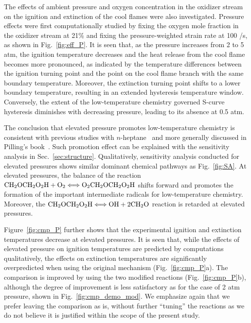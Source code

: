 \documentclass[review,3p,times]{elsarticle}
\begin{document}
The effects of ambient pressure and oxygen concentration in the oxidizer stream on the ignition and extinction of the cool flames were also investigated.  Pressure effects were first computationally studied by fixing the oxygen mole fraction in the oxidizer stream at 21\% and fixing the pressure-weighted strain rate at 100 /s, as shown in Fig.~\ref{fig:eff_P}.  It is seen that, as the pressure increases from 2 to 5 atm, the ignition temperature decreases and the heat release from the cool flame becomes more pronounced, as indicated by the temperature differences between the ignition turning point and the point on the cool flame branch with the same boundary temperature.  Moreover, the extinction turning point shifts to a lower boundary temperature, resulting in an extended hysteresis temperature window.  Conversely, the extent of the low-temperature chemistry governed S-curve hysteresis diminishes with decreasing pressure, leading to its absence at 0.5 atm.

\textcolor{Rev1}{The conclusion that elevated pressure promotes low-temperature chemistry is consistent with previous studies with $n$-heptane~\cite{ciezki93,law12} and more generally discussed in Pilling's book~\cite{pillingbook}}.  Such promotion effect can be explained with the sensitivity analysis in Sec.~\ref{sec:structure}.  Qualitatively, sensitivity analysis conducted for elevated pressures shows similar dominant chemical pathways as Fig.~\ref{fig:SA}.  At elevated pressures, the balance of the reaction $\rm{CH}_2\rm{OCH}_2\rm{O}_2\rm{H} + \rm{O}_2 \Longleftrightarrow \rm{O}_2\rm{CH}_2\rm{OCH}_2\rm{O}_2\rm{H}$ shifts forward and promotes the formation of the important intermediate radicals for low-temperature chemistry.  Moreover, the $\rm{CH}_2\rm{OCH}_2\rm{O}_2\rm{H} \Longleftrightarrow \rm{OH} + 2\rm{CH}_2\rm{O}$ reaction is retarded at elevated pressures.

Figure~\ref{fig:cmp_P} further shows that the experimental ignition and extinction temperatures decrease at elevated pressures.  It is seen that, while the effects of elevated pressure on ignition temperatures are predicted by computations qualitatively, the effects on extinction temperatures are significantly overpredicted when using the original mechanism (Fig.~\ref{fig:cmp_P}a).  The comparison is improved by using the two modified reactions (Fig.~\ref{fig:cmp_P}b), although the degree of improvement is less satisfactory as for the case of 2 atm pressure, shown in Fig.~\ref{fig:cmp_demo_mod}. We emphasize again that we prefer leaving the comparison as is, without further “tuning” the reactions as we do not believe it is justified within the scope of the present study. 
\end{document}
